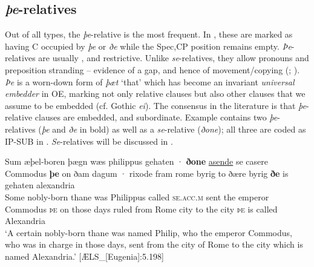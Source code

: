 \documentclass[output=paper,colorlinks,citecolor=brown]{langscibook}
\begin{document}
\subsection{\textit{þe}-relatives}\label{sec:los:2.2}
Out of all types, the \textit{þe}{}-relative is the most frequent. In , these are marked as having C occupied by \textit{þe} or \textit{ðe} while the Spec,CP position remains empty. \textit{Þe}{}-relatives are usually , and restrictive. Unlike \textit{se}{}-relatives, they allow  pronouns and preposition stranding – evidence of a gap, and hence of movement/copying (\citealt{Allen1977}; \citealt{vanKemenade1987}). \textit{Þe} is a worn-down form of \textit{þæt} ‘that' which has become an invariant \textit{universal embedder} in OE, marking not only relative clauses but also other clauses that we assume to be embedded (cf. Gothic \textit{ei}). The consensus in the literature is that \textit{þe}{}-relative clauses are embedded, and subordinate. Example  contains two \textit{þe}{}-relatives (\textit{þe} and \textit{ðe} in bold) as well as a \textit{se}{}-relative (\textit{ðone}); all three are coded as IP-SUB in . \textit{Se}-relatives will be discussed in .

\ea
\label{ex:los:3}
\gll Sum æþel-boren þægn wæs philippus {gehaten ·} \textbf{ðone} \underline{asende} se casere Commodus \textbf{þe} on ðam {dagum ·} rixode fram rome byrig to ðære byrig \textbf{ðe} is gehaten alexandria\\
Some nobly-born thane was Philippus called \textsc{se.acc.m} sent the emperor Commodus \textsc{þe} on those days ruled from Rome city to the city \textsc{þe} is called Alexandria\\
\glt ‘A certain nobly-born thane was named Philip, who the emperor Commodus, who was in charge in those days, sent from the city of Rome to the city which is named Alexandria.' \hfill [ÆLS\_[Eugenia]:5.198]
\z
\end{document}

